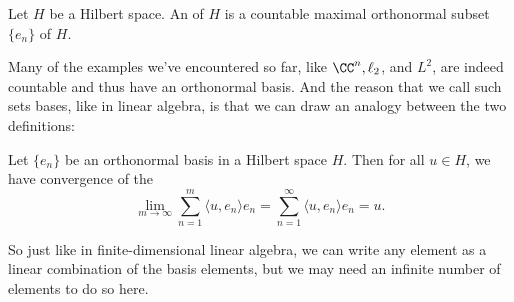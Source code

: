 \begin{definition}
Let $H$ be a Hilbert space. An  of $H$ is a countable maximal orthonormal subset $\{e_n\}$ of $H$.
\end{definition}

Many of the examples we've encountered so far, like $\CC^n, \ell_2$, and $L^2$, are indeed countable and thus have an orthonormal basis. And the reason that we call such sets bases, like in linear algebra, is that we can draw an analogy between the two definitions:

\begin{theorem}\label{orthonormconv}
Let $\{e_n\}$ be an orthonormal basis in a Hilbert space $H$. Then for all $u \in H$, we have convergence of the 
\[
    \lim_{m \to \infty} \sum_{n=1}^m \langle u, e_n \rangle e_n = \sum_{n=1}^\infty \langle u, e_n \rangle e_n = u.
\]
\end{theorem}

So just like in finite-dimensional linear algebra, we can write any element as a linear combination of the basis elements, but we may need an infinite number of elements to do so here.

